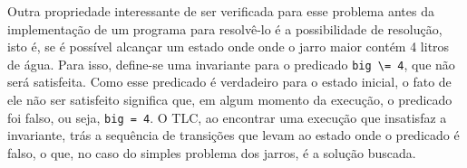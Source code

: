 Outra propriedade interessante de ser verificada para esse problema antes da implementação de um programa para resolvê-lo é a possibilidade de resolução, isto é, se é possível alcançar um estado onde onde o jarro maior contém 4 litros de água. Para isso, define-se uma invariante para o predicado \texttt{big \backslash= 4}, que não será satisfeita. Como esse predicado é verdadeiro para o estado inicial, o fato de ele não ser satisfeito significa que, em algum momento da execução, o predicado foi falso, ou seja, \texttt{big = 4}. O TLC, ao encontrar uma execução que insatisfaz a invariante, trás a sequência de transições que levam ao estado onde o predicado é falso, o que, no caso do simples problema dos jarros, é a solução buscada.

